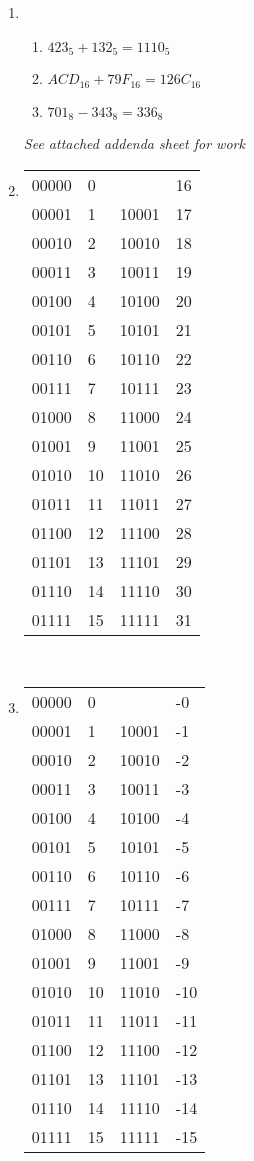 \begin{enumerate}[leftmargin=2cm,labelsep=.5cm,label=\bf\arabic*.]
\item 
\begin{enumerate}
\item $423_5 + 132_5 = 1110_5$
  \item $ACD_{16} + 79F_{16} = 126C_{16}$
  \item $701_8 - 343_8 = 336_8$\\
\end{enumerate}
\textit{See attached addenda sheet for work}\\[5mm]

\item
\begin{tabu}[t]{r|lr|l}
00000 &0 & &16 \\
00001 &1 & 10001 &17 \\
00010 &2 & 10010 &18 \\
00011 &3 & 10011 &19 \\
00100 &4 & 10100 &20 \\
00101 &5 & 10101 &21 \\
00110 &6 & 10110 &22 \\
00111 &7 & 10111 &23 \\
01000 &8 & 11000 &24 \\
01001 &9 & 11001 &25 \\
01010 &10 & 11010 &26 \\
01011 &11 & 11011 &27 \\
01100 &12 & 11100 &28 \\
01101 &13 & 11101 &29 \\
01110 &14 & 11110 &30 \\
01111 &15 & 11111 &31 \\
\end{tabu}\\[5mm]

\item
\begin{tabu}[t]{r|lr|l}
00000 &0 & &-0 \\
00001 &1 & 10001 & -1 \\
00010 &2 & 10010 & -2 \\
00011 &3 & 10011 &-3 \\
00100 &4 & 10100 &-4 \\
00101 &5 & 10101 &-5 \\
00110 &6 & 10110 &-6 \\
00111 &7 & 10111 &-7 \\
01000 &8 & 11000 &-8 \\
01001 &9 & 11001 &-9 \\
01010 &10 & 11010 &-10 \\
01011 &11 & 11011 &-11 \\
01100 &12 & 11100 &-12 \\
01101 &13 & 11101 &-13 \\
01110 &14 & 11110 &-14 \\
01111 &15 & 11111 &-15 \\
\end{tabu}\\[5mm]


\end{enumerate}
